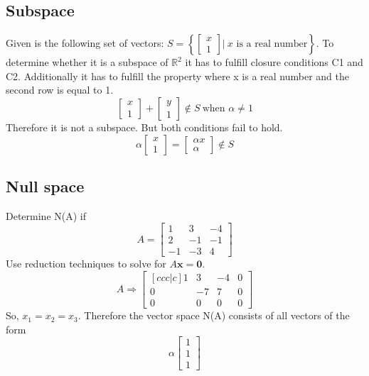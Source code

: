 \documentclass{article}
\begin{document}
\subsection{Subspace} \label{subspace}
Given is the following set of vectors: $S = \left\{ \begin{bmatrix}
x \\ 1
\end{bmatrix} | \ x \text{ is a real number} \right\}$. To determine whether it is a subspace of $\mathbb{R}^2$ it has to fulfill closure conditions C1 and C2. Additionally it has to fulfill the property where x is a real number and the second row is equal to 1.
\begin{equation*}
\begin{bmatrix}
x \\ 1
\end{bmatrix}
+
\begin{bmatrix}
y \\ 1
\end{bmatrix}
\not\in S \ \text{when } \alpha \neq 1
\end{equation*}
Therefore it is not a subspace. But both conditions fail to hold.
\begin{equation*}
\alpha \begin{bmatrix}
x \\ 1
\end{bmatrix}
=
\begin{bmatrix}
\alpha x \\ \alpha
\end{bmatrix}
\not\in S
\end{equation*}

\subsection{Null space} \label{nullspace}
Determine N(A) if
\begin{equation*}
A = \begin{bmatrix}
1 & 3& -4 \\
2 & -1 & -1 \\
-1 & -3 & 4
\end{bmatrix}
\end{equation*}
Use reduction techniques to solve for $A\textbf{x}= \textbf{0}$.
\begin{equation*}
A \Rightarrow \begin{bmatrix}[ccc|c]
1 & 3 & -4 & 0\\
0 & -7 & 7 & 0 \\
0 & 0 & 0 & 0
\end{bmatrix}
\end{equation*}
So, $x_1 = x_2 = x_3$. Therefore the vector space N(A) consists of all vectors of the form
\begin{equation*}
\alpha \begin{bmatrix}
1 \\ 1 \\ 1
\end{bmatrix}
\end{equation*}
\end{document}
